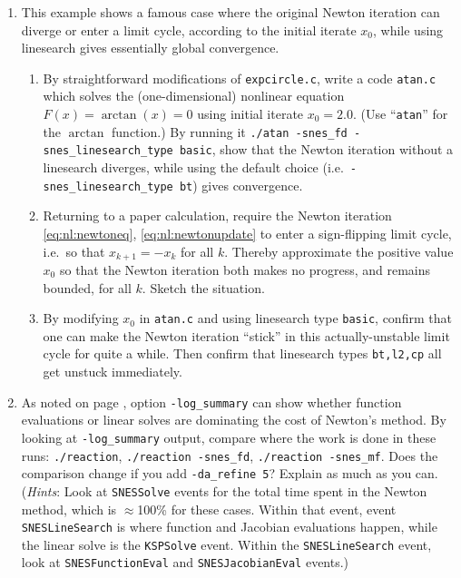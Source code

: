 \begin{enumerate}
\item  \label{exer:newtonatan}
This example shows a famous case where the original Newton iteration can diverge or enter a limit cycle, according to the initial iterate $x_0$, while using linesearch gives essentially global convergence.
    \begin{enumerate}
    \item By straightforward modifications of \texttt{expcircle.c}, write a code \texttt{atan.c} which solves the (one-dimensional) nonlinear equation $F(x)=\arctan(x)=0$ using initial iterate $x_0=2.0$.  (Use ``\texttt{atan}'' for the $\arctan$ function.)  By running it \texttt{./atan -snes\_fd -snes\_linesearch\_type basic}, show that the Newton iteration without a linesearch diverges, while using the default choice (i.e.~\texttt{-snes\_linesearch\_type bt}) gives convergence.
    \item Returning to a paper calculation, require the Newton iteration \eqref{eq:nl:newtoneq}, \eqref{eq:nl:newtonupdate} to enter a sign-flipping limit cycle, i.e.~so that $x_{k+1} = - x_k$ for all $k$.  Thereby approximate the positive value $x_0$ so that the Newton iteration both makes no progress, and remains bounded, for all $k$.  Sketch the situation.
    \item By modifying $x_0$ in \texttt{atan.c} and using linesearch type \texttt{basic}, confirm that one can make the Newton iteration ``stick'' in this actually-unstable limit cycle for quite a while.  Then confirm that linesearch types \texttt{bt,l2,cp} all get unstuck immediately.
    \end{enumerate}

\item As noted on page \pageref{sidenote:logsummary}, \PETSc option \texttt{-log\_summary} can show whether function evaluations or linear solves are dominating the cost of Newton's method.  By looking at \texttt{-log\_summary} output, compare where the work is done in these runs: \texttt{./reaction}, \texttt{./reaction -snes\_fd}, \texttt{./reaction -snes\_mf}.  Does the comparison change if you add \texttt{-da\_refine 5}?  Explain as much as you can.  (\emph{Hints}: Look at \texttt{SNESSolve} events for the total time spent in the Newton method, which is $\approx$100\% for these cases.  Within that event, event \texttt{SNESLineSearch} is where function and Jacobian evaluations happen, while the linear solve is the \texttt{KSPSolve} event.  Within the \texttt{SNESLineSearch} event, look at \texttt{SNESFunctionEval} and \texttt{SNESJacobianEval} events.)


\end{enumerate}
